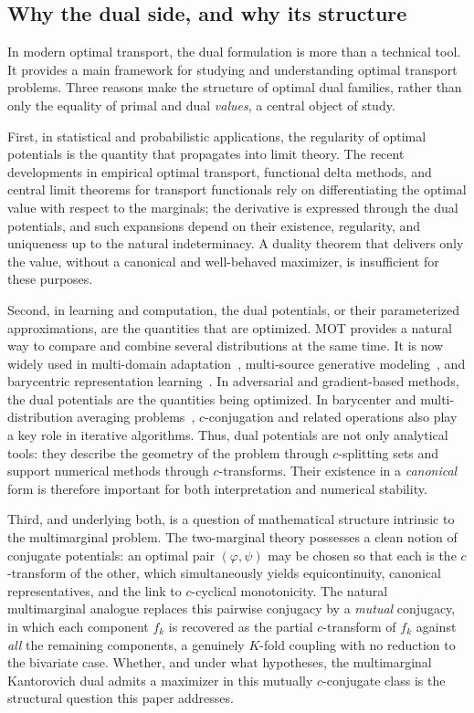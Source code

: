 \documentclass[twoside,11pt,a4paper]{article}
\begin{document}
\subsection{Why the dual side, and why its structure}

In modern optimal transport, the dual formulation is more than a technical tool. It provides a main framework for studying and understanding optimal transport problems. Three reasons make the structure of optimal dual families, rather than only the equality of primal and dual \emph{values}, a central object of study.


First, in statistical and probabilistic applications, the regularity of optimal
potentials is the quantity that propagates into limit theory. The recent
developments in empirical optimal transport, functional delta methods, and
central limit theorems for transport functionals
\cite{del2019,tameling2019,fournier2015} rely on differentiating the optimal
value with respect to the marginals; the derivative is expressed through the dual
potentials, and such expansions depend on their existence, regularity, and uniqueness up to the natural indeterminacy. A duality theorem
that delivers only the value, without a canonical and well-behaved maximizer, is
insufficient for these purposes.

Second, in learning and computation, the dual potentials, or their parameterized approximations, are the quantities that are optimized. MOT provides a natural way to compare and combine several distributions at the same time. It is now widely used in multi-domain adaptation~\cite{Hui2018,He2019}, multi-source generative modeling~\cite{cao2019,genevay2018,deshpande2018}, and barycentric representation learning~\cite{peyre2019}. In adversarial and gradient-based methods, the dual potentials are the quantities being optimized. In barycenter and multi-distribution averaging problems~\cite{peyre2019}, $c$-conjugation and related operations also play a key role in iterative algorithms. Thus, dual potentials are not only analytical tools: they describe the geometry of the problem through $c$-splitting sets and support numerical methods through $c$-transforms. Their existence in a \emph{canonical} form is therefore important for both interpretation and numerical stability.

Third, and underlying both, is a question of mathematical structure intrinsic to
the multimarginal problem. The two-marginal theory possesses a clean notion of
conjugate potentials: an optimal pair $(\varphi,\psi)$ may be chosen so that each
is the $c$-transform of the other, which simultaneously yields equicontinuity,
canonical representatives, and the link to $c$-cyclical monotonicity. The natural
multimarginal analogue replaces this pairwise conjugacy by a \emph{mutual}
conjugacy, in which each component $f_k$ is recovered as the partial $c$-transform
of $f_k$ against \emph{all} the remaining components, a genuinely $K$-fold
coupling with no reduction to the bivariate case. Whether, and under what
hypotheses, the multimarginal Kantorovich dual admits a maximizer in this
mutually $c$-conjugate class is the structural question this paper addresses.
\end{document}
